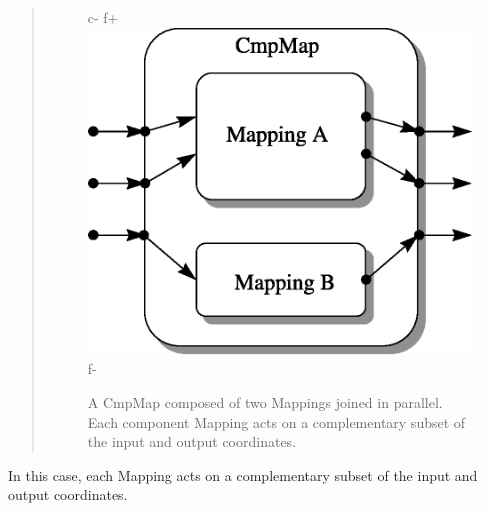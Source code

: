 \documentclass[twoside,11pt]{article}
\begin{document}
{\begin{htmlonly}
\begin{quote}
\begin{figure}
c-
f+
   \includegraphics[scale=1.0]{sun210_figures/parallel.eps}
f-
   \caption{A CmpMap composed of two Mappings joined in parallel. Each
   component Mapping acts on a complementary subset of the input and
   output coordinates.}
   \end{figure}
   \end{quote}
\end{htmlonly}
In this case, each Mapping acts on a complementary subset of the
input and output coordinates.

}
\end{document}
